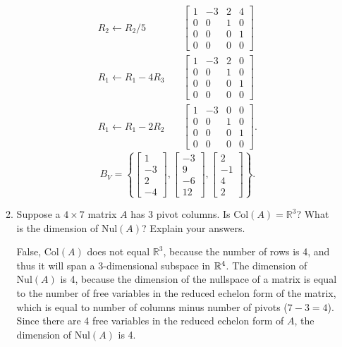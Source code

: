 \documentclass{zc-ust-hw}
\begin{document}
\begin{enumerate}
\begin{enumerate}
\begin{sol}
\begin{align}
        R_2 \leftarrow R_2 / 5
        &\quad
        \begin{bmatrix} 
          1 & -3 & 2 & 4\\
          0 & 0 & 1 & 0\\
          0 & 0 & 0 & 1\\
          0 & 0 & 0 & 0
        \end{bmatrix} \\
        R_1 \leftarrow R_1 - 4R_3
        &\quad
        \begin{bmatrix} 
          1 & -3 & 2 & 0\\
          0 & 0 & 1 & 0\\
          0 & 0 & 0 & 1\\
          0 & 0 & 0 & 0
        \end{bmatrix} \\
        R_1 \leftarrow R_1 - 2R_2
        &\quad
        \begin{bmatrix} 
          1 & -3 & 0 & 0\\
          0 & 0 & 1 & 0\\
          0 & 0 & 0 & 1\\
          0 & 0 & 0 & 0
        \end{bmatrix}
      .\end{align}
      \begin{equation}
        B_V = \left\{ \begin{bmatrix} 1\\-3\\2\\-4 \end{bmatrix}, \begin{bmatrix} -3\\9\\-6\\12 \end{bmatrix}, \begin{bmatrix} 2\\-1\\4\\2 \end{bmatrix} \right\}
      .\end{equation}
    \end{sol}

  \item Suppose a $4 \times 7$ matrix $A$ has 3 pivot columns. Is
    $\text{Col}(A)=\mathbb{R}^3$?  What is the dimension of $\text{Nul}(A)$?
    Explain your answers. 
    \begin{sol}
      False, $\text{Col}(A)$ does not equal $\mathbb{R}^3$, because the number
      of rows is 4, and thus it will span a 3-dimensional subspace in $\mathbb{R}^4$.
      The dimension of $\text{Nul}(A)$ is 4, because the dimension of the
      nullspace of a matrix is equal to the number of free variables in the
      reduced echelon form of the matrix, which is equal to number of columns
      minus number of pivots ($7-3=4$). Since there are 4 free variables in the
      reduced echelon form of $A$, the dimension of $\text{Nul}(A)$ is 4.
    \end{sol}


\end{enumerate}
\end{enumerate}
\end{document}
